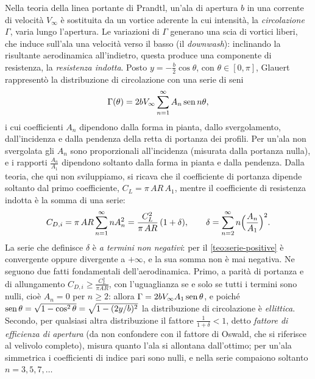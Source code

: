 Nella teoria della linea portante di Prandtl, un'ala di apertura $b$ in una corrente di
velocità $V_{\infty}$ è sostituita da un vortice aderente la cui intensità, la
\emph{circolazione} $\Gamma$, varia lungo l'apertura. Le variazioni di $\Gamma$ generano una scia
di vortici liberi, che induce sull'ala una velocità verso il basso (il \emph{downwash}):
inclinando la risultante aerodinamica all'indietro, questa produce una componente di
resistenza, la \emph{resistenza indotta}. Posto $y=-\frac b2\cos\theta$, con
$\theta\in[0,\pi]$, Glauert rappresentò la distribuzione di circolazione con una serie di seni
\begin{equation}\label{eq:glauert}
  \Gamma(\theta)=2bV_{\infty}\sum_{n=1}^{\infty}A_{n}\operatorname{sen} n\theta ,
\end{equation}
i cui coefficienti $A_{n}$ dipendono dalla forma in pianta, dallo svergolamento,
dall'incidenza e dalla pendenza della retta di portanza dei profili. Per un'ala non
svergolata gli $A_{n}$ sono proporzionali all'incidenza (misurata dalla portanza nulla), e
i rapporti $\frac{A_{n}}{A_{1}}$ dipendono soltanto dalla forma in pianta e dalla pendenza.
Dalla teoria, che qui non sviluppiamo, si ricava che il coefficiente di portanza dipende
soltanto dal primo coefficiente, $C_{L}=\pi\,AR\,A_{1}$, mentre il coefficiente di resistenza
indotta è la somma di una serie:
\begin{equation}\label{eq:resistenza-indotta}
  C_{D,i}=\pi\,AR\sum_{n=1}^{\infty}nA_{n}^{2}
  =\frac{C_{L}^{2}}{\pi\,AR}\,(1+\delta), \qquad
  \delta=\sum_{n=2}^{\infty}n\Bigl(\frac{A_{n}}{A_{1}}\Bigr)^{2} .
\end{equation}
La serie che definisce $\delta$ è \emph{a termini non negativi}: per il
\cref{teo:serie-positive} è convergente oppure divergente a $+\infty$, e la sua somma non è
mai negativa. Ne seguono due fatti fondamentali dell'aerodinamica. Primo, a parità di
portanza e di allungamento $C_{D,i}\ge\frac{C_{L}^{2}}{\pi AR}$, con l'uguaglianza se e solo se tutti i
termini sono nulli, cioè $A_{n}=0$ per $n\ge2$: allora $\Gamma=2bV_{\infty}A_{1}\operatorname{sen}\theta$, e poiché
$\operatorname{sen}\theta=\sqrt{1-\cos^{2}\theta}=\sqrt{1-(2y/b)^{2}}$ la distribuzione di circolazione è
\emph{ellittica}. Secondo, per qualsiasi altra distribuzione il fattore $\frac1{1+\delta}<1$,
detto \emph{fattore di efficienza di apertura} (da non confondere con il fattore di
Oswald, che si riferisce al velivolo completo), misura quanto l'ala si allontana
dall'ottimo; per un'ala simmetrica i coefficienti di
indice pari sono nulli, e nella serie compaiono soltanto $n=3,5,7,\dots$

